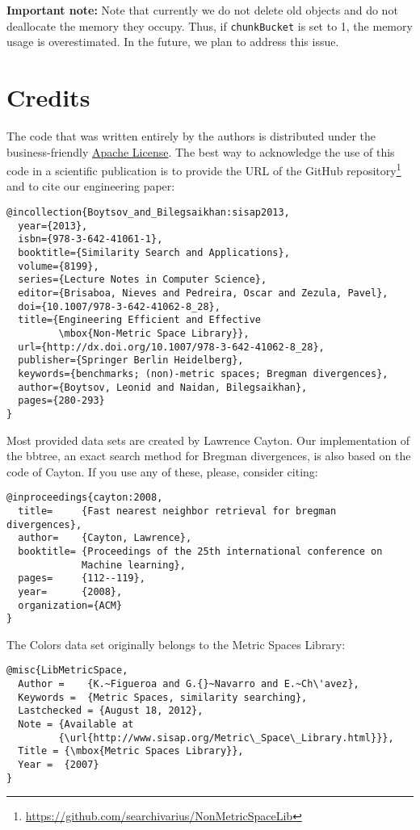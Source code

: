 \documentclass[runningheads,a4paper]{llncs}
\newcommand{\ttt}[1]{\texttt{#1}}
\begin{document}
\textbf{Important note:}
Note that currently we do not delete old objects and do not deallocate the memory 
they occupy. Thus, 
if 
\ttt{chunkBucket} is set to 1,
the memory usage is overestimated.
In the future, we plan to address this issue.

\section{Credits}\label{SectionCredits}
The code that was written entirely by the authors is distributed 
under the business-friendly \href{http://apache.org/licenses/LICENSE-2.0}{Apache License}. 
The best way to acknowledge the use of this code 
in a scientific publication is to 
provide the URL of the GitHub repository\footnote{\url{https://github.com/searchivarius/NonMetricSpaceLib}} 
and to cite our engineering paper:
\begin{verbatim}
@incollection{Boytsov_and_Bilegsaikhan:sisap2013,
  year={2013},
  isbn={978-3-642-41061-1},
  booktitle={Similarity Search and Applications},
  volume={8199},
  series={Lecture Notes in Computer Science},
  editor={Brisaboa, Nieves and Pedreira, Oscar and Zezula, Pavel},
  doi={10.1007/978-3-642-41062-8_28},
  title={Engineering Efficient and Effective 
         \mbox{Non-Metric Space Library}},
  url={http://dx.doi.org/10.1007/978-3-642-41062-8_28},
  publisher={Springer Berlin Heidelberg},
  keywords={benchmarks; (non)-metric spaces; Bregman divergences},
  author={Boytsov, Leonid and Naidan, Bilegsaikhan},
  pages={280-293}
}
\end{verbatim}


Most provided data sets are created by Lawrence Cayton.
Our implementation of the bbtree, 
an exact search method for Bregman divergences,
is also based on the code of Cayton.
If you use any of these, please, consider citing:
\begin{verbatim}
@inproceedings{cayton:2008,
  title=     {Fast nearest neighbor retrieval for bregman divergences},
  author=    {Cayton, Lawrence},
  booktitle= {Proceedings of the 25th international conference on 
             Machine learning},
  pages=     {112--119},
  year=      {2008},
  organization={ACM}
}
\end{verbatim}

The Colors data set originally belongs to the Metric Spaces Library: 
\begin{verbatim}
@misc{LibMetricSpace, 
  Author =    {K.~Figueroa and G.{}~Navarro and E.~Ch\'avez}, 
  Keywords =  {Metric Spaces, similarity searching}, 
  Lastchecked = {August 18, 2012}, 
  Note = {Available at 
         {\url{http://www.sisap.org/Metric\_Space\_Library.html}}}, 
  Title = {\mbox{Metric Spaces Library}}, 
  Year =  {2007}
} 
\end{verbatim}
\end{document}

